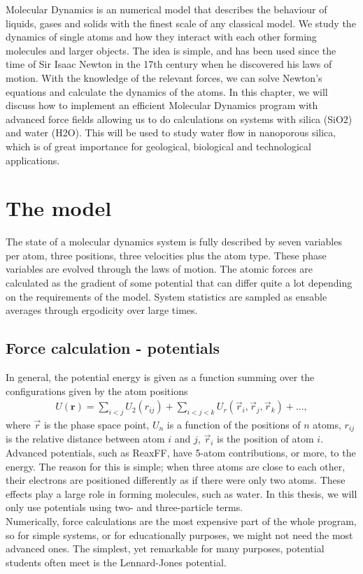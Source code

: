 Molecular Dynamics is an numerical model that describes the behaviour of liquids, gases and solids with the finest scale of any classical model. We study the dynamics of single atoms and how they interact with each other forming molecules and larger objects. The idea is simple, and has been used since the time of Sir Isaac Newton in the 17th century when he discovered his laws of motion. With the knowledge of the relevant forces, we can solve Newton's equations and calculate the dynamics of the atoms. In this chapter, we will discuss how to implement an efficient Molecular Dynamics program with advanced force fields allowing us to do calculations on systems with silica (SiO2) and water (H2O). This will be used to study water flow in nanoporous silica, which is of great importance for geological, biological and technological applications.

\section{The model}
The state of a molecular dynamics system is fully described by seven variables per atom, three positions, three velocities plus the atom type. These phase variables are evolved through the laws of motion. The atomic forces are calculated as the gradient of some potential that can differ quite a lot depending on the requirements of the model. System statistics are sampled as ensable averages through ergodicity over large times. 
\subsection{Force calculation - potentials}
In general, the potential energy is given as a function summing over the configurations given by the atom positions
\begin{align}
	U(\textbf{r}) = \sum_{i<j}U_2(r_{ij}) + \sum_{i<j<k} U_r(\vec r_i, \vec r_j, \vec r_k) + ...,
\end{align}
where $\vec r$ is the phase space point, $U_n$ is a function of the positions of $n$ atoms, $r_{ij}$ is the relative distance between atom $i$ and $j$, $\vec r_i$ is the position of atom $i$. Advanced potentials, such as ReaxFF, have 5-atom contributions, or more, to the energy. The reason for this is simple; when three atoms are close to each other, their electrons are positioned differently as if there were only two atoms. These effects play a large role in forming molecules, such as water. In this thesis, we will only use potentials using two- and three-particle terms.\\
Numerically, force calculations are the most expensive part of the whole program, so for simple systems, or for educationally purposes, we might not need the most advanced ones. The simplest, yet remarkable for many purposes, potential students often meet is the Lennard-Jones potential.
